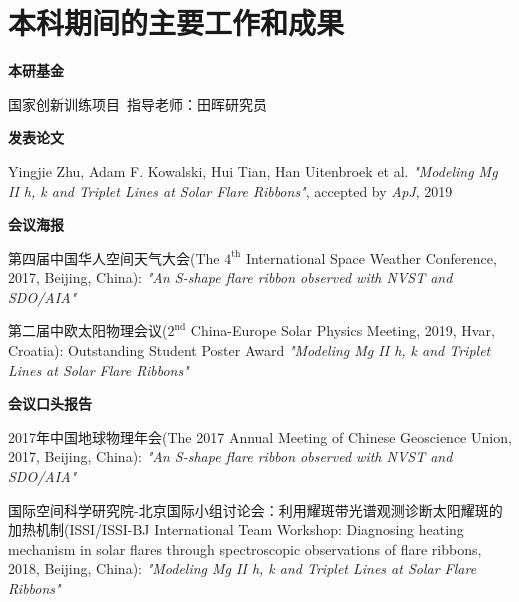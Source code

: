 
\chapter{本科期间的主要工作和成果}
\noindent
\textbf{本研基金}

国家创新训练项目\ 指导老师：田晖研究员

\noindent
\textbf{发表论文}

Yingjie Zhu, Adam F. Kowalski, Hui Tian, Han Uitenbroek et al. \emph{"Modeling Mg II h, k and Triplet Lines at Solar Flare Ribbons"}, accepted by \emph{ApJ}, 2019

\noindent
\textbf{会议海报}

第四届中国华人空间天气大会(The $4^{\mathrm{th}}$ International Space Weather Conference, 2017, Beijing, China): \emph{"An S-shape flare ribbon observed with NVST and SDO/AIA"} 

第二届中欧太阳物理会议($2^{\mathrm{nd}}$ China-Europe Solar Physics Meeting, 2019, Hvar, Croatia): Outstanding Student Poster Award \emph{"Modeling Mg II h, k and Triplet Lines at Solar Flare Ribbons"} 

\noindent
\textbf{会议口头报告}

2017年中国地球物理年会(The 2017 Annual Meeting of Chinese Geoscience Union, 2017, Beijing, China): \emph{"An S-shape flare ribbon observed with NVST and SDO/AIA"} 

国际空间科学研究院-北京国际小组讨论会：利用耀斑带光谱观测诊断太阳耀斑的加热机制(ISSI/ISSI-BJ International Team Workshop: Diagnosing heating mechanism in solar flares through spectroscopic observations of flare ribbons, 2018, Beijing, China): \emph{"Modeling Mg II h, k and Triplet Lines at Solar Flare Ribbons"} 
